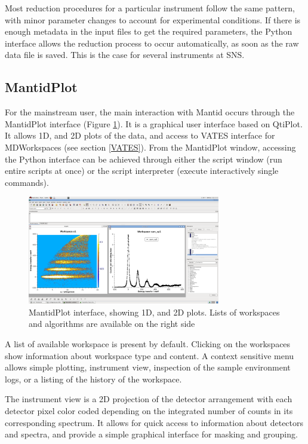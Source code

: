 \documentclass{elsarticle}
\begin{document}
Most reduction procedures for a particular instrument follow the same pattern, with minor parameter changes to account for experimental conditions. If there is enough metadata in the input files to get the required parameters, the Python interface allows the reduction process to occur automatically, as soon as the raw data file is saved. This is the case for several instruments at SNS. 

\subsection{MantidPlot}
For the mainstream user, the main interaction with Mantid occurs through the MantidPlot interface (Figure \ref{fig:MantidPlot}). It is a graphical user interface based on QtiPlot\cite{qtiplot}. It allows 1D, and 2D plots of the data, and access to VATES interface for MDWorkspaces (see section \ref{VATES}). From the MantidPlot window, accessing the Python interface can be achieved through either the script window (run entire scripts at once) or the script interpreter (execute interactively single commands).

\begin{figure}[!ht]
\centerline{\includegraphics[width=0.75\textwidth]{MantidPlot.png}}
\caption{MantidPlot interface, showing 1D, and 2D plots. Lists of workspaces and algorithms are available on the right side}
\label{fig:MantidPlot}
\end{figure}
A list of available workspace is present by default. Clicking on the workspaces show information about workspace type and content. A context sensitive menu allows simple plotting, instrument view, inspection of the sample environment logs, or a listing of the history of the workspace. 

The instrument view is a 2D projection of the detector arrangement with each detector pixel color coded depending on the integrated number of counts in its corresponding spectrum. It allows for quick access to information about detectors and spectra, and provide a simple graphical interface for masking and grouping.
\end{document}
